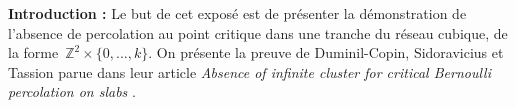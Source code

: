 \vspace*{0.3cm}
\begin{center}
\begin{minipage}{0.85\textwidth}
	\textbf{Introduction :}
	Le but de cet exposé est de présenter la démonstration de l'absence de percolation au point critique dans une tranche du réseau cubique, de la forme~$\mathbb{Z}^2\times\{0,...,k\}$. On présente la preuve de Duminil-Copin, Sidoravicius et Tassion parue dans leur article \emph{Absence of infinite cluster for critical Bernoulli percolation on slabs} \cite{main}.
\end{minipage}
\end{center}
